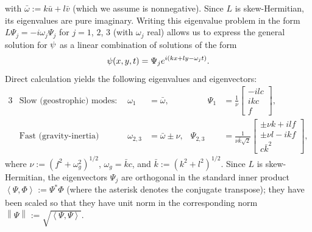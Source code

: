 \documentclass[12pt]{article}
\newcommand{\ubar}{\bar{u}}
\newcommand{\vbar}{\bar{v}}
\newcommand{\kbar}{\bar{k}}
\newcommand{\omegabar}{\bar{\omega}}
\newcommand{\norm}[2][{}]{\ensuremath{\left\|{#2}\right\|_{#1}}}
\newcommand{\ip}[3][{}]{\ensuremath{\left\langle{#2},{#3}\right\rangle_{#1}}}
\begin{document}
with $\omegabar := k\ubar + l\vbar$ (which we assume is nonnegative).
Since $L$ is skew-Hermitian, its eigenvalues are pure imaginary.
Writing this eigenvalue problem in the form
$L\Psi_j = -i\omega_j\Psi_j$ for $j=1$, $2$, $3$ (with $\omega_j$ real)
allows us to express the general solution for $\psi$ as a linear combination 
of solutions of the form 
\begin{equation}
  \psi(x,y,t) = \Psi_j e^{i(kx+ly-\omega_j t)} .
\end{equation}
Direct calculation yields the following eigenvalues and eigenvectors:
\begin{alignat}{3}
&\mbox{Slow (geostrophic) modes:} & \omega_1 &= \omegabar, & \qquad
   \displaystyle\Psi_1 &= \frac{1}{\nu}\begin{bmatrix}
            -ilc \\ ikc \\ f \end{bmatrix} ,
\\[24pt]
&\mbox{Fast (gravity-inertia) modes:}\quad & \omega_{2,3} &= \omegabar\pm\nu, &
   \displaystyle\Psi_{2,3} &= \frac{1}{\nu\kbar\sqrt{2}}\begin{bmatrix}
            \pm\nu k + ilf \\ \pm\nu l - ikf \\ c\kbar^2 \end{bmatrix} ,
\end{alignat}
where $\nu := (f^2 + \omega_g^2)^{1/2}$, $\omega_g=\kbar c$, and $\kbar :=
(k^2 + l^2)^{1/2}$.  Since $L$ is skew-Hermitian, the eigenvectors $\Psi_j$
are orthogonal in the standard inner product $\ip{\Psi}{\Phi} := \Psi^*\Phi$
(where the asterisk denotes the conjugate transpose); they have been
scaled so that they have unit norm in the corresponding norm
$\norm{\Psi}:=\sqrt{\ip{\Psi}{\Psi}}$.
\end{document}
